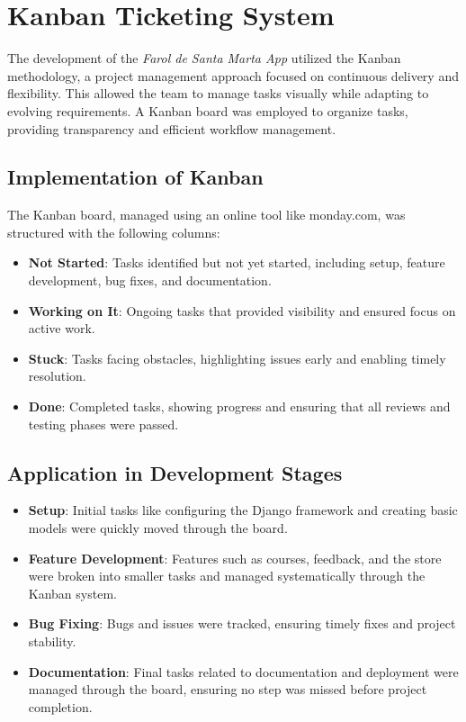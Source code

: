 \section{Kanban Ticketing System}

The development of the \textit{Farol de Santa Marta App} utilized the Kanban methodology\cite{kniberg2010}, a project management approach focused on continuous delivery and flexibility. This allowed the team to manage tasks visually while adapting to evolving requirements. A Kanban board was employed to organize tasks, providing transparency and efficient workflow management.

\subsection{Implementation of Kanban}

The Kanban board, managed using an online tool like monday.com\cite{monday}, was structured with the following columns:

\begin{itemize}
    \item \textbf{Not Started}: Tasks identified but not yet started, including setup, feature development, bug fixes, and documentation.
    \item \textbf{Working on It}: Ongoing tasks that provided visibility and ensured focus on active work.
    \item \textbf{Stuck}: Tasks facing obstacles, highlighting issues early and enabling timely resolution.
    \item \textbf{Done}: Completed tasks, showing progress and ensuring that all reviews and testing phases were passed.
\end{itemize}

\subsection{Application in Development Stages}

\begin{itemize}
    \item \textbf{Setup}: Initial tasks like configuring the Django framework and creating basic models were quickly moved through the board.
    \item \textbf{Feature Development}: Features such as courses, feedback, and the store were broken into smaller tasks and managed systematically through the Kanban system.
    \item \textbf{Bug Fixing}: Bugs and issues were tracked, ensuring timely fixes and project stability.
    \item \textbf{Documentation}: Final tasks related to documentation and deployment were managed through the board, ensuring no step was missed before project completion.
\end{itemize}

